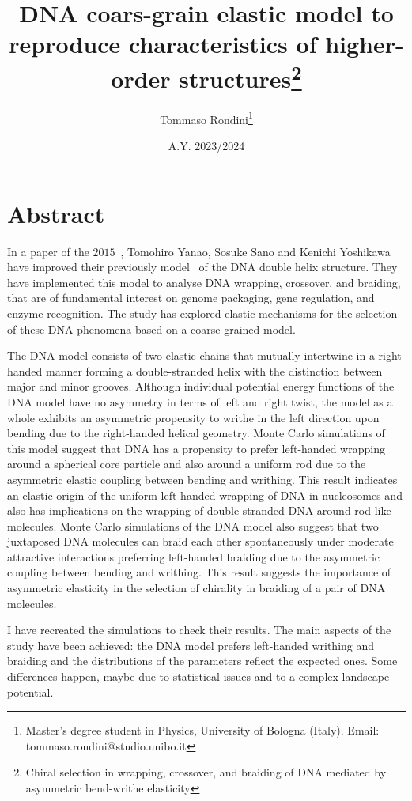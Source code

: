 \documentclass[a4paper,10pt]{article}
\title{DNA coars-grain elastic model to reproduce characteristics of higher-order structures\thanks{Chiral selection in wrapping, crossover, and braiding of DNA mediated by asymmetric bend-writhe elasticity\cite{main}}}
\author{Tommaso Rondini\thanks{Master's degree student in Physics, University of Bologna (Italy). Email: tommaso.rondini@studio.unibo.it}}
\date{A.Y. 2023/2024}
\begin{document}
\maketitle

\section*{Abstract}
In a paper of the $2015$~\cite{main}, Tomohiro Yanao, Sosuke Sano and Kenichi Yoshikawa have improved their previously model~\cite{old, very_old} of the DNA double helix structure.
They have implemented this model to analyse DNA wrapping, crossover, and braiding, that are of fundamental interest on genome packaging, gene regulation, and enzyme recognition.
The study has explored elastic mechanisms for the selection of these DNA phenomena based on a coarse-grained model.

The DNA model consists of two elastic chains that mutually intertwine in a right-handed manner forming a double-stranded helix with the distinction between major and minor grooves.
Although individual potential energy functions of the DNA model have no asymmetry in terms of left and right twist, the model as a whole exhibits an asymmetric propensity to writhe in the left direction upon bending due to the right-handed helical geometry.
Monte Carlo simulations of this model suggest that DNA has a propensity to prefer left-handed wrapping around a spherical core particle and also around a uniform rod due to the asymmetric elastic coupling between bending and writhing.
This result indicates an elastic origin of the uniform left-handed wrapping of DNA in nucleosomes and also has implications on the wrapping of double-stranded DNA around rod-like molecules.
Monte Carlo simulations of the DNA model also suggest that two juxtaposed DNA molecules can braid each other spontaneously under moderate attractive interactions preferring left-handed braiding due to the asymmetric coupling between bending and writhing.
This result suggests the importance of asymmetric elasticity in the selection of chirality in braiding of a pair of DNA molecules.

I have recreated the simulations to check their results.
The main aspects of the study have been achieved: the DNA model prefers left-handed writhing and braiding and the distributions of the parameters reflect the expected ones.
Some differences happen, maybe due to statistical issues and to a complex landscape potential.
\end{document}
